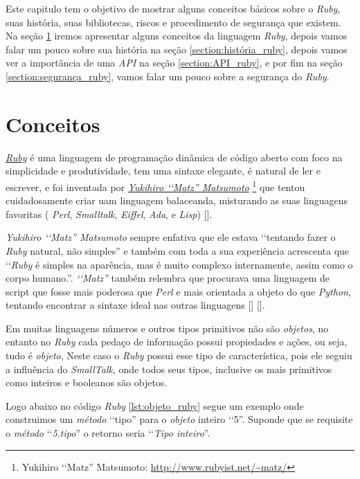 Este capitulo tem o objetivo de mostrar alguns conceitos básicos sobre o \emph{Ruby}, suas
história, suas bibliotecas, riscos e procedimento de segurança que existem.
Na seção \ref{section:conceitos_ruby} iremos apresentar alguns conceitos da linguagem \emph{Ruby},
depois vamos falar um pouco sobre sua história na seção \ref{section:história_ruby}, depois vamos ver
a importância de uma \emph{API} na seção \ref{section:API_ruby}, e por fim na seção
\ref{section:segurança_ruby}, vamos falar um pouco sobre a segurança do \emph{Ruby}.

\section{Conceitos}
\label{section:conceitos_ruby}

\emph{\href{https://www.ruby-lang.org/en/}{Ruby}} é uma linguagem de programação
dinâmica de código aberto com foco na simplicidade e produtividade, tem uma sintaxe elegante, é natural de
ler e escrever, e foi inventada por \emph{ \href{http://www.rubyist.net/~matz/}{Yukihiro ‘‘Matz'' Matsumoto}}
\footnote{Yukihiro ‘‘Matz'' Matsumoto: \url{http://www.rubyist.net/~matz/}}
que tentou cuidadosamente criar uam linguagem balaceanda, misturando as suas linguagens favoritas
( \emph{Perl}, \emph{Smalltalk}, \emph{Eiffel}, \emph{Ada}, e \emph{Lisp}) [].

\emph{{Yukihiro ‘‘Matz'' Matsumoto}} sempre enfativa que ele estava ‘‘tentando fazer o \emph{Ruby} natural, não simples'' e também com toda a
sua experiência acrescenta que ‘‘\emph{Ruby} é simples na aparência, mas é muito complexo internamente, assim
como o corpo humano.''. \emph{‘‘Matz''} também relembra que procurava uma linguagem de script que fosse mais
poderosa que \emph{Perl} e mais orientada a objeto do que \emph{Python}, tentando encontrar a
sintaxe ideal nas outras linguagens [] [].

Em muitas linguagens números e outros tipos primitivos não são \emph{objetos}, no entanto no \emph{Ruby}
cada pedaço de informação possui propiedades e ações, ou seja, tudo é \emph{objeto}, Neste caso o
\emph{Ruby} possui esse tipo de característica, pois ele seguiu a influência do \emph{SmallTalk}, onde
todos seus tipos, inclusive os mais primitivos como inteiros e booleanos são objetos.

Logo abaixo no código \emph{Ruby} \ref{lst:objeto_ruby} segue um
exemplo onde construimos um \emph{método} ‘‘tipo'' para o \emph{objeto} inteiro ‘‘5''. Suponde que se
requisite o \emph{método} ‘‘\emph{5.tipo}'' o retorno seria ‘‘\emph{Tipo inteiro}''.

